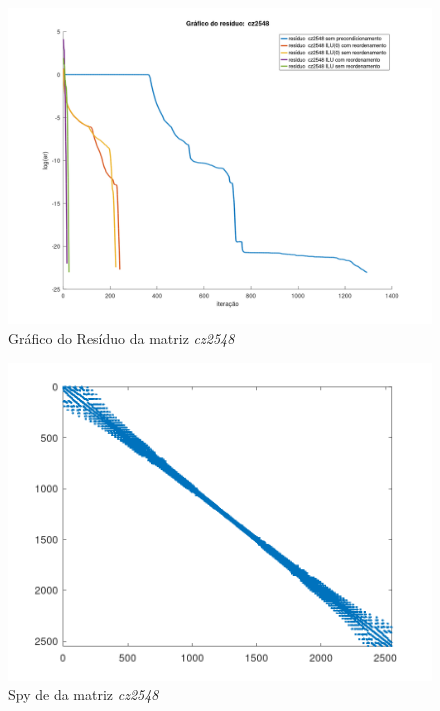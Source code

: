 \begin{figure}[H]
    \centering
         \centering
         \includegraphics[width=.6\linewidth]{images/cz2548.png}
         \caption{Gráfico do Resíduo da matriz \textit{cz2548}}
         \label{fig:cz-res}
\end{figure}

\begin{figure}[H]
    \centering
         \centering
         \includegraphics[width=.5\linewidth]{images/cz2548_spyA.png}
         \caption{Spy de da matriz \textit{cz2548}}
         \label{fig:cz-spy-a}
\end{figure}

